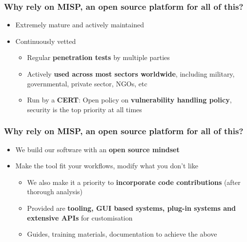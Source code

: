 \begin{frame}
\frametitle{Why rely on MISP, an open source platform for all of this?}
    \begin{itemize}
        \item Extremely mature and actively maintained
        \item Continuously vetted 
        \begin{itemize}
            \item Regular {\bf penetration tests} by multiple parties
            \item Actively {\bf used across most sectors worldwide}, including military, governmental, private sector, NGOs, etc
            \item Run by a {\bf CERT}: Open policy on {\bf vulnerability handling policy}, security is the top priority at all times
        \end{itemize}
    \end{itemize}
\end{frame}

\begin{frame}
\frametitle{Why rely on MISP, an open source platform for all of this?}
    \begin{itemize}
        \item We build our software with an {\bf open source mindset}
        \item Make the tool fit your workflows, modify what you don't like
        \begin{itemize}
            \item We also make it a priority to {\bf incorporate code contributions} (after thorough analysis)
            \item Provided are {\bf tooling, GUI based systems, plug-in systems and extensive APIs} for customisation
            \item Guides, training materials, documentation to achieve the above
        \end{itemize}
    \end{itemize}
\end{frame}

